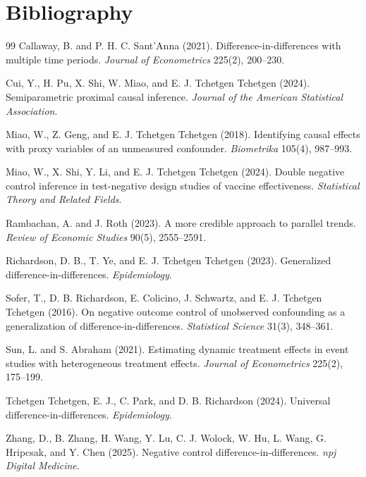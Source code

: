 \documentclass[11pt]{article}
\theoremstyle{definition}
\theoremstyle{plain}
\theoremstyle{remark}
\begin{document}
\section*{Bibliography}
\begin{thebibliography}{99}
Callaway, B. and P. H. C. Sant'Anna (2021).
Difference-in-differences with multiple time periods.
\emph{Journal of Econometrics} 225(2), 200--230.

Cui, Y., H. Pu, X. Shi, W. Miao, and E. J. Tchetgen Tchetgen (2024).
Semiparametric proximal causal inference.
\emph{Journal of the American Statistical Association}.

Miao, W., Z. Geng, and E. J. Tchetgen Tchetgen (2018).
Identifying causal effects with proxy variables of an unmeasured confounder.
\emph{Biometrika} 105(4), 987--993.

Miao, W., X. Shi, Y. Li, and E. J. Tchetgen Tchetgen (2024).
Double negative control inference in test-negative design studies of vaccine effectiveness.
\emph{Statistical Theory and Related Fields}.

Rambachan, A. and J. Roth (2023).
A more credible approach to parallel trends.
\emph{Review of Economic Studies} 90(5), 2555--2591.

Richardson, D. B., T. Ye, and E. J. Tchetgen Tchetgen (2023).
Generalized difference-in-differences.
\emph{Epidemiology}.

Sofer, T., D. B. Richardson, E. Colicino, J. Schwartz, and E. J. Tchetgen Tchetgen (2016).
On negative outcome control of unobserved confounding as a generalization of difference-in-differences.
\emph{Statistical Science} 31(3), 348--361.

Sun, L. and S. Abraham (2021).
Estimating dynamic treatment effects in event studies with heterogeneous treatment effects.
\emph{Journal of Econometrics} 225(2), 175--199.

Tchetgen Tchetgen, E. J., C. Park, and D. B. Richardson (2024).
Universal difference-in-differences.
\emph{Epidemiology}.

Zhang, D., B. Zhang, H. Wang, Y. Lu, C. J. Wolock, W. Hu, L. Wang, G. Hripcsak, and Y. Chen (2025).
Negative control difference-in-differences.
\emph{npj Digital Medicine}.
\end{thebibliography}
\end{document}
